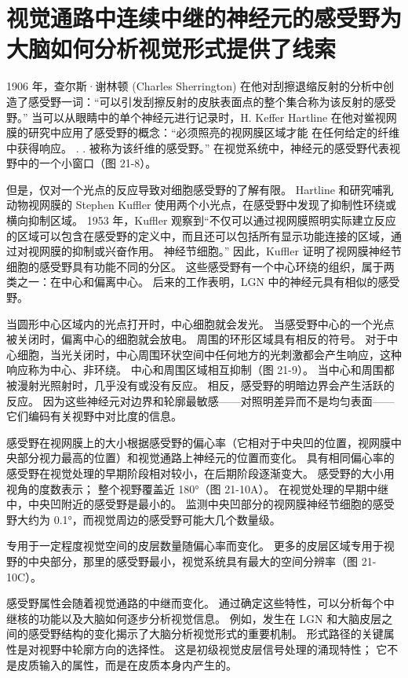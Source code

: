 \section{视觉通路中连续中继的神经元的感受野为大脑如何分析视觉形式提供了线索}
1906 年，查尔斯·谢林顿 (Charles Sherrington) 在他对刮擦退缩反射的分析中创造了感受野一词：“可以引发刮擦反射的皮肤表面点的整个集合称为该反射的感受野。” 当可以从眼睛中的单个神经元进行记录时，H. Keffer Hartline 在他对鲎视网膜的研究中应用了感受野的概念：“必须照亮的视网膜区域才能 在任何给定的纤维中获得响应。 . . 被称为该纤维的感受野。” 在视觉系统中，神经元的感受野代表视野中的一个小窗口（图 21-8）。

但是，仅对一个光点的反应导致对细胞感受野的了解有限。 Hartline 和研究哺乳动物视网膜的 Stephen Kuffler 使用两个小光点，在感受野中发现了抑制性环绕或横向抑制区域。 1953 年，Kuffler 观察到“不仅可以通过视网膜照明实际建立反应的区域可以包含在感受野的定义中，而且还可以包括所有显示功能连接的区域，通过对视网膜的抑制或兴奋作用。 神经节细胞。” 因此，Kuffler 证明了视网膜神经节细胞的感受野具有功能不同的分区。 这些感受野有一个中心环绕的组织，属于两类之一：在中心和偏离中心。 后来的工作表明，LGN 中的神经元具有相似的感受野。

当圆形中心区域内的光点打开时，中心细胞就会发光。 当感受野中心的一个光点被关闭时，偏离中心的细胞就会放电。 周围的环形区域具有相反的符号。 对于中心细胞，当光关闭时，中心周围环状空间中任何地方的光刺激都会产生响应，这种响应称为中心、非环绕。 中心和周围区域相互抑制（图 21-9）。 当中心和周围都被漫射光照射时，几乎没有或没有反应。 相反，感受野的明暗边界会产生活跃的反应。 因为这些神经元对边界和轮廓最敏感——对照明差异而不是均匀表面——它们编码有关视野中对比度的信息。

感受野在视网膜上的大小根据感受野的偏心率（它相对于中央凹的位置，视网膜中央部分视力最高的位置）和视觉通路上神经元的位置而变化。 具有相同偏心率的感受野在视觉处理的早期阶段相对较小，在后期阶段逐渐变大。 感受野的大小用视角的度数表示； 整个视野覆盖近 180°（图 21-10A）。 在视觉处理的早期中继中，中央凹附近的感受野是最小的。 监测中央凹部分的视网膜神经节细胞的感受野大约为 0.1°，而视觉周边的感受野可能大几个数量级。

专用于一定程度视觉空间的皮层数量随偏心率而变化。 更多的皮层区域专用于视野的中央部分，那里的感受野最小，视觉系统具有最大的空间分辨率（图 21-10C）。

感受野属性会随着视觉通路的中继而变化。 通过确定这些特性，可以分析每个中继核的功能以及大脑如何逐步分析视觉信息。 例如，发生在 LGN 和大脑皮层之间的感受野结构的变化揭示了大脑分析视觉形式的重要机制。 形式路径的关键属性是对视野中轮廓方向的选择性。 这是初级视觉皮层信号处理的涌现特性； 它不是皮质输入的属性，而是在皮质本身内产生的。

